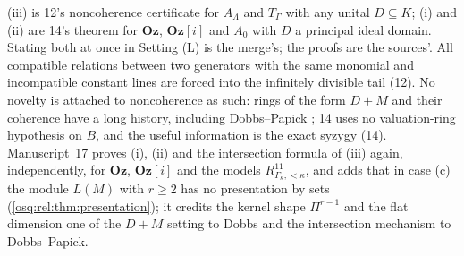\documentclass[11pt,letterpaper]{article}
\numberwithin{equation}{section}
\theoremstyle{definition}
\theoremstyle{remark}
\theoremstyle{plain}
\newcommand{\Oz}{\mathbf{Oz}}
\newcommand{\GOz}{\Oz[i]}
\begin{document}
(iii) is 12's noncoherence certificate for $A_\Lambda$ and $T_\Gamma$ with any unital $D\subseteq K$;
(i) and (ii) are 14's theorem for $\Oz$, $\GOz$ and $A_0$ with $D$ a principal ideal domain. Stating both at once in
Setting (L) is the merge's; the proofs are the sources'. All compatible relations between two generators with the same
monomial and incompatible constant lines are forced into the infinitely divisible tail (12). No novelty is attached to
noncoherence as such: rings of the form $D+M$ and their coherence have a long history, including Dobbs--Papick
\cite{DobbsPapick}; 14 uses no valuation-ring hypothesis on $B$, and the useful information is the exact syzygy (14).
Manuscript~17 proves (i), (ii) and the intersection formula of (iii) again, independently, for $\Oz$, $\GOz$ and the models
$R^{11}_{\Gamma_\kappa,<\kappa}$, and adds that in case (c) the module $L(M)$ with $r\ge2$ has no presentation by sets
(\cref{osq:rel:thm:presentation}); it credits the kernel shape $\Pi^{r-1}$ and the flat dimension one of the $D+M$ setting to
Dobbs \cite{Dobbs} and the intersection mechanism to Dobbs--Papick.
\end{document}
